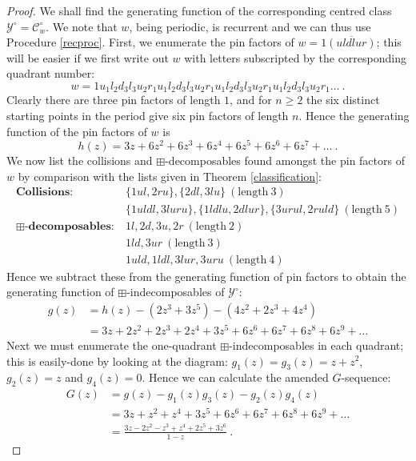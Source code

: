 \documentclass[11pt,a4paper]{article}
\theoremstyle{definition}
\begin{document}
\begin{proof}
We shall find the generating function of the corresponding centred class $\mathcal{Y}^{\circ} = \mathcal{C}^{\circ}_{w}$. We note that $w$, being periodic, is recurrent and we can thus use Procedure \ref{recproc}. First, we enumerate the pin factors of $w=1\overline{(uldlur)}$; this will be easier if we first write out $w$ with letters subscripted by the corresponding quadrant number:
\[
w = 1u_{1}l_{2}d_{3}l_{3}u_{2}r_{1}u_{1}l_{2}d_{3}l_{3}u_{2}r_{1}u_{1}l_{2}d_{3}l_{3}u_{2}r_{1}u_{1}l_{2}d_{3}l_{3}u_{2}r_{1}\dots \ .
\]
Clearly there are three pin factors of length $1$, and for $n \geq 2$ the six distinct starting points in the period give six pin factors of length $n$. Hence the generating function of the pin factors of $w$ is
\[
h(z) = 3z + 6z^2 + 6z^3 + 6z^4 + 6z^5 + 6z^6 + 6z^7 + \dots \ .
\]
We now list the collisions and $\boxplus$-decomposables found amongst the pin factors of $w$ by comparison with the lists given in Theorem \ref{classification}:
\[
\begin{split}
\textbf{Collisions:} \  & \{1ul, 2ru\}, \{2dl, 3lu\} \ (\text{length} \ 3)\\
 & \{1uldl, 3luru\}, \{1ldlu, 2dlur\}, \{3urul, 2ruld\} \ (\text{length} \ 5) \\
\textbf{$\boxplus$-decomposables:} \ & 1l, 2d, 3u, 2r \ (\text{length} \ 2) \\
& 1ld, 3ur \ (\text{length} \ 3) \\
& 1uld, 1ldl, 3lur, 3uru \ (\text{length} \ 4)
\end{split}
\]
Hence we subtract these from the generating function of pin factors to obtain the generating function of $\boxplus$-indecomposables of $\mathcal{Y}^{\circ}$:
\[
\begin{split}
g(z) & = h(z) - (2z^3 + 3z^5) - (4z^2 + 2z^3 + 4z^4) \\
 & = 3z + 2z^2 + 2z^3 + 2z^4 + 3z^5 + 6z^6 + 6z^7 + 6z^8 + 6z^9 + \dots
\end{split}
\]
Next we must enumerate the one-quadrant $\boxplus$-indecomposables in each quadrant; this is easily-done by looking at the diagram: $g_{1}(z) = g_{3}(z) = z + z^2$, $g_{2}(z)=z$ and $g_{4}(z)=0$. Hence we can calculate the amended $G$-sequence:
\[
\begin{split}
G(z) & = g(z) - g_{1}(z)g_{3}(z) - g_{2}(z)g_{4}(z) \\
 & = 3z + z^2 + z^4 + 3z^5 + 6z^6 + 6z^7 + 6z^8 + 6z^9 + \dots \\
 & = \frac{3z - 2z^2 - z^3 + z^4 + 2z^5 + 3z^6}{1-z} \ .

\end{split}\]
\end{proof}
\end{document}
